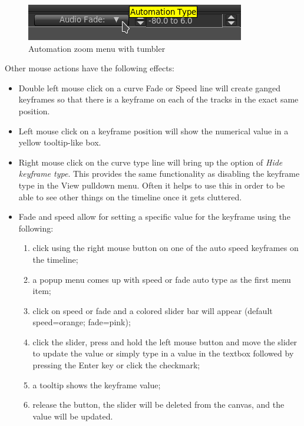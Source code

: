 \begin{figure}[htpb]
    \centering
    \includegraphics[width=0.7\linewidth]{images/automation.png}
    \caption{Automation zoom menu with tumbler}
    \label{fig:automation}
\end{figure}

\noindent Other mouse actions have the following effects:

\begin{itemize}
    \item Double left mouse click on a curve Fade or Speed line will create ganged keyframes so that there is a
    keyframe on each of the tracks in the exact same position.
    \item Left mouse click on a keyframe position will show the numerical value in a yellow tooltip-like box.
    \item Right mouse click on the curve type line will bring up the option of \textit{Hide keyframe type}.   This
    provides the same functionality as disabling the keyframe type in the View pulldown menu.  Often it
    helps to use this in order to be able to see other things on the timeline once it gets cluttered.
    \item Fade and speed allow for setting a specific value for the keyframe using the following:
    \begin{enumerate}
        \item click using the right mouse button on one of the auto speed keyframes on the timeline;
        \item a popup menu comes up with speed or fade auto type as the first menu item;
        \item click on speed or fade and a colored slider bar will appear (default speed=orange; fade=pink);
        \item click the slider, press and hold the left mouse button and move the slider to update the value or
        simply type in a value in the textbox followed by pressing the Enter key or click the checkmark;
        \item a tooltip shows the keyframe value;
        \item release the button, the slider will be deleted from the canvas, and the value will be updated.
    \end{enumerate}
\end{itemize}

